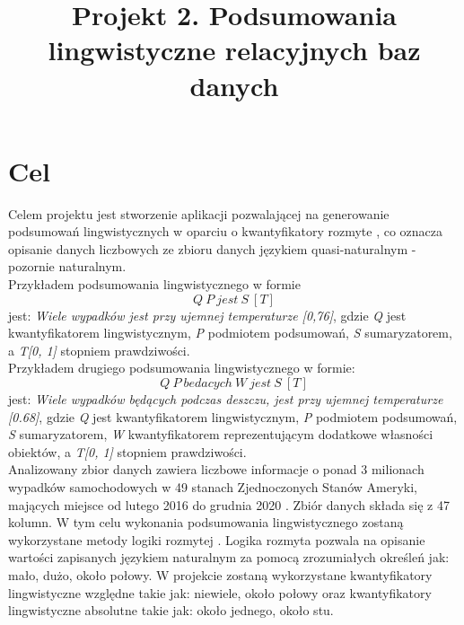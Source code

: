 \documentclass{classrep}
\author{
  \studentinfo{Julia Szymańska}{224441} \and
  \studentinfo{Przemysław Zdrzalik}{224466} }
\title{Projekt 2.  Podsumowania lingwistyczne relacyjnych baz danych}
\begin{document}
\maketitle

\section{Cel}
Celem projektu jest stworzenie aplikacji pozwalającej na generowanie podsumowań lingwistycznych \cite{przyklad} w oparciu o kwantyfikatory rozmyte \cite{niewiadomskiRozmyte}, co oznacza opisanie danych liczbowych ze zbioru danych \cite{dane} językiem quasi-naturalnym - pozornie naturalnym. \\Przykładem podsumowania lingwistycznego \cite{przyklad} w formie 
\begin{equation} Q\ P\ jest\ S\ [T] \end{equation}
 jest:  \textit{Wiele wypadków jest przy ujemnej temperaturze [0,76]}, gdzie \textit{Q} jest kwantyfikatorem lingwistycznym, \textit{P} podmiotem podsumowań, \textit{S} sumaryzatorem, a \textit{T[0, 1]} stopniem prawdziwości. \\ \newline Przykładem drugiego podsumowania lingwistycznego w formie:
\begin{equation}  Q \ P \ bedacych\ W\ jest\ S\ [T] \end{equation} 
jest: \textit{Wiele wypadków będących podczas deszczu, jest przy ujemnej temperaturze [0.68]}, gdzie \textit{Q} jest kwantyfikatorem lingwistycznym, \textit{P} podmiotem podsumowań, \textit{S} sumaryzatorem, \textit{W} kwantyfikatorem reprezentującym dodatkowe własności obiektów, a \textit{T[0, 1]} stopniem prawdziwości.  \\ \newline
Analizowany zbior danych zawiera liczbowe informacje o ponad 3 milionach wypadków samochodowych w 49 stanach Zjednoczonych Stanów Ameryki, mających miejsce od lutego 2016 do grudnia 2020 \cite{dane}. Zbiór danych składa się z 47 kolumn. W tym celu wykonania podsumowania lingwistycznego zostaną wykorzystane metody logiki rozmytej \cite{fuzzy}. Logika rozmyta pozwala na opisanie wartości zapisanych językiem naturalnym za pomocą zrozumiałych określeń jak: mało, dużo, około połowy. W projekcie zostaną wykorzystane kwantyfikatory lingwistyczne względne takie jak: niewiele, około połowy oraz kwantyfikatory lingwistyczne absolutne takie jak: około jednego, około stu.
\end{document}
